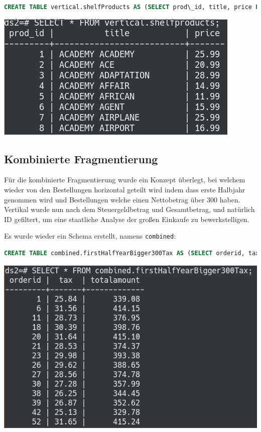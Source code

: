 \begin{lstlisting}[language=SQL]
CREATE TABLE vertical.shelfProducts AS (SELECT prod\_id, title, price FROM products);
\end{lstlisting}

\begin{minipage}{\linewidth}
	\centering
	\includegraphics[width=0.5\linewidth]{images/table3}
\end{minipage}
\subsection{Kombinierte Fragmentierung}
Für die kombinierte Fragmentierung wurde ein Konzept überlegt, bei welchem wieder von den Bestellungen horizontal geteilt wird indem dass erste Halbjahr genommen wird und Bestellungen welche einen Nettobetrag über 300 haben. Vertikal wurde nun nach dem Steuergeldbetrag und Gesamtbetrag, und natürlich ID gefiltert, um eine staatliche Analyse der großen Einkaufe zu bewerkstelligen.

Es wurde wieder ein Schema erstellt, namens \verb|combined|:

\begin{lstlisting}[language=SQL]
CREATE TABLE combined.firstHalfYearBigger300Tax AS (SELECT orderid, tax, totalamount FROM orders WHERE netamount > 300 AND orderdate < '2009-07-01');
\end{lstlisting}

\begin{minipage}{\linewidth}
	\centering
	\includegraphics[width=0.8\linewidth]{images/table4}
\end{minipage}
